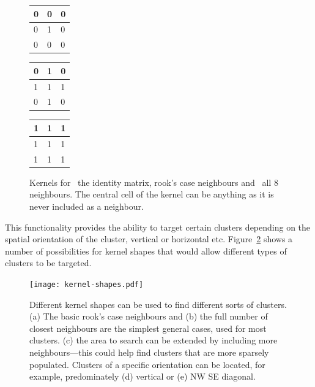 \begin{figure}[tbhp]
	\centering
	\begin{subtable}[b]{0.2\textwidth}
	\centering
		\begin{tabular}{|l|l|l|}
			\hline
			0 & 0 & 0 \\
			\hline
			0 & \cellcolor{lred}1 & 0 \\
			\hline
			0 & 0 & 0 \\
			\hline
		\end{tabular}
		\caption{}\label{fig:kernel-identity}
	\end{subtable}%
	\quad
	\begin{subtable}[b]{0.2\textwidth}
	\centering
		\begin{tabular}{|l|l|l|}
			\hline
			0 & 1 & 0 \\
			\hline
			1 & \cellcolor{lred}1 & 1 \\
			\hline
			0 & 1 & 0 \\
			\hline
		\end{tabular}
		\caption{}\label{fig:kernel-image-rooks}
	\end{subtable}%
	\quad
	\begin{subtable}[b]{0.2\textwidth}
	\centering
		\begin{tabular}{|l|l|l|}
			\hline
			1 & 1 & 1 \\
			\hline
			1 & \cellcolor{lred}1 & 1 \\
			\hline
			1 & 1 & 1 \\
			\hline
		\end{tabular}
		\caption{}\label{fig:kernel-image-all8}
	\end{subtable}

	\caption[Kernels for the identity matrix, rook's case and all 8
		neighbours.]{Kernels for~ the identity
		matrix, rook's case neighbours
		and~ all 8 neighbours. The central cell of the
		kernel can be anything as it is never included as a neighbour.}\label{fig:kernel-neighbours}
\end{figure}

This functionality provides the ability to target certain clusters depending on
the spatial orientation of the cluster, vertical or horizontal etc.
Figure~\ref{fig:kernel-shapes} shows a number of possibilities for kernel
shapes that would allow different types of clusters to be targeted.

\begin{figure}[htbp]
	\centering
	\texttt{[image: kernel-shapes.pdf]}

	\caption[Different kernel shapes for different clusters.]{Different kernel
		shapes can be used to find different sorts of clusters. (a) The basic
		rook's case neighbours and (b) the full number of closest neighbours
		are the simplest general cases, used for most clusters. (c) the area to
		search can be extended by including more neighbours---this could help
		find clusters that are more sparsely populated. Clusters of a specific
		orientation can be located, for example, predominately (d) vertical or
		(e) NW SE diagonal.}\label{fig:kernel-shapes}
\end{figure}

